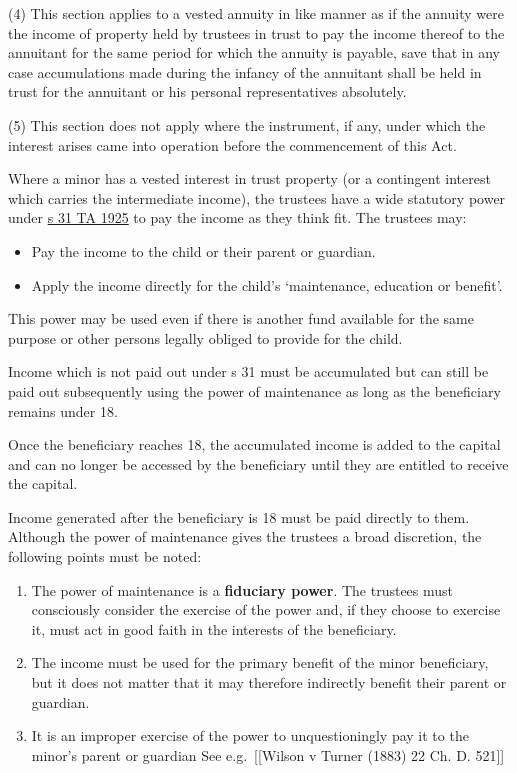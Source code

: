 \documentclass[
]{article}
\newenvironment{Shaded}{}{}
\newcommand{\NormalTok}[1]{#1}
\providecommand{\tightlist}{%
  \setlength{\itemsep}{0pt}\setlength{\parskip}{0pt}}
\begin{document}
\begin{Shaded}
\begin{Highlighting}[]
\NormalTok{(4) This section applies to a vested annuity in like manner as if the annuity were the income of property held by trustees in trust to pay the income thereof to the annuitant for the same period for which the annuity is payable, save that in any case accumulations made during the infancy of the annuitant shall be held in trust for the annuitant or his personal representatives absolutely.}

\NormalTok{(5) This section does not apply where the instrument, if any, under which the interest arises came into operation before the commencement of this Act.}
\end{Highlighting}
\end{Shaded}

Where a minor has a vested interest in trust property (or a contingent
interest which carries the intermediate income), the trustees have a
wide statutory power under
\href{https://www.legislation.gov.uk/ukpga/Geo5/15-16/19/section/31}{s
31 TA 1925} to pay the income as they think fit. The trustees may:

\begin{itemize}
\tightlist
\item
  Pay the income to the child or their parent or guardian.
\item
  Apply the income directly for the child's `maintenance, education or
  benefit'.
\end{itemize}

This power may be used even if there is another fund available for the
same purpose or other persons legally obliged to provide for the child.

Income which is not paid out under s 31 must be accumulated but can
still be paid out subsequently using the power of maintenance as long as
the beneficiary remains under 18.

Once the beneficiary reaches 18, the accumulated income is added to the
capital and can no longer be accessed by the beneficiary until they are
entitled to receive the capital.

Income generated after the beneficiary is 18 must be paid directly to
them. Although the power of maintenance gives the trustees a broad
discretion, the following points must be noted:

\begin{enumerate}
\def\labelenumi{\arabic{enumi}.}
\tightlist
\item
  The power of maintenance is a \textbf{fiduciary power}. The trustees
  must consciously consider the exercise of the power and, if they
  choose to exercise it, must act in good faith in the interests of the
  beneficiary.
\item
  The income must be used for the primary benefit of the minor
  beneficiary, but it does not matter that it may therefore indirectly
  benefit their parent or guardian.
\item
  It is an improper exercise of the power to unquestioningly pay it to
  the minor's parent or guardian See e.g.~{[}{[}Wilson v Turner (1883)
  22 Ch. D. 521{]}{]}
\end{enumerate}
\end{document}
